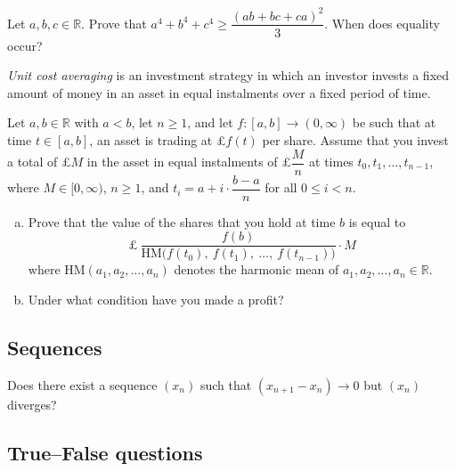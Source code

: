 \begin{chapex}
Let $a,b,c \in \mathbb{R}$. Prove that $a^4 + b^4 + c^4 \ge \dfrac{(ab+bc+ca)^2}{3}$. When does equality occur?
\end{chapex}

\begin{chapex}
\textit{Unit cost averaging} is an investment strategy in which an investor invests a fixed amount of money in an asset in equal instalments over a fixed period of time.

Let $a,b \in \mathbb{R}$ with $a<b$, let $n \ge 1$, and let $f : [a,b] \to (0,\infty)$ be such that at time $t \in [a,b]$, an asset is trading at £$f(t)$ per share. Assume that you invest a total of £$M$ in the asset in equal instalments of £$\dfrac{M}{n}$ at times $t_0, t_1, \dots, t_{n-1}$, where $M \in [0,\infty)$, $n \ge 1$, and $t_i = a + i \cdot \dfrac{b-a}{n}$ for all $0 \le i < n$.

\begin{enumerate}[(a)]
\item Prove that the value of the shares that you hold at time $b$ is equal to
\[ \text{£}~\dfrac{f(b)}{\mathrm{HM} \big ( f(t_0),~ f(t_1),~ \dots,~ f(t_{n-1}) \big)} \cdot M \]
where $\mathrm{HM}(a_1,a_2,\dots,a_n)$ denotes the harmonic mean of $a_1,a_2,\dots,a_n \in \mathbb{R}$.

\item Under what condition have you made a profit?
\end{enumerate}
\end{chapex}

\subsection*{Sequences}

\begin{chapex}
Does there exist a sequence $(x_n)$ such that $(x_{n+1} - x_n) \to 0$ but $(x_n)$ diverges?
\end{chapex}

\subsection*{True--False questions}


